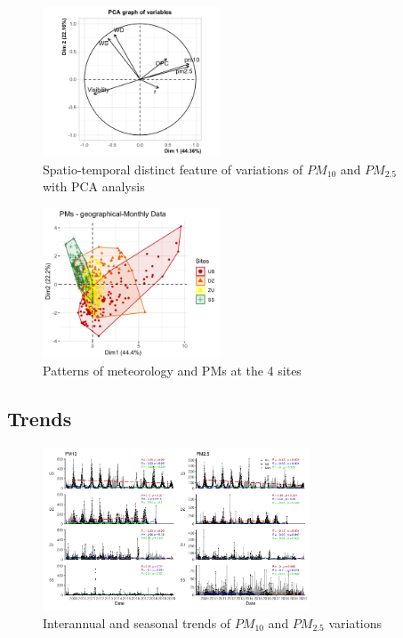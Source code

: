\documentclass[
  11pt,
]{article}
\begin{document}
\newpage

\begin{figure}
\centering
\includegraphics[width=2.08333in,height=\textheight]{images/figure_7.png}
\caption{Spatio-temporal distinct feature of variations of \(PM_{10}\)
and \(PM_{2.5}\) with PCA analysis}
\end{figure}

\begin{figure}
\centering
\includegraphics[width=2.08333in,height=\textheight]{images/figure_7b.png}
\caption{Patterns of meteorology and PMs at the 4 sites}
\end{figure}

\newpage
\subsection{Trends}

\begin{figure}
\centering
\includegraphics[width=3.125in,height=\textheight]{images/figure_8.png}
\caption{Interannual and seasonal trends of \(PM_{10}\) and \(PM_{2.5}\)
variations}
\end{figure}
\end{document}
